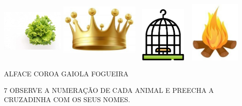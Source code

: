 \includegraphics[width=1.22307in,height=1.24422in]{media/image86.jpg}
\includegraphics[width=1.53669in,height=1.29710in]{media/image87.jpg}
\includegraphics[width=1.09375in,height=1.09375in]{media/image88.png}
\includegraphics[width=1.03854in,height=1.20356in]{media/image89.jpg}

\begin{mdframed}[linewidth=2pt,linecolor=salmao,roundcorner=2pt]
ALFACE \hfill COROA \hfill GAIOLA \hfill FOGUEIRA
\end{mdframed}

\pagebreak
\num{7} OBSERVE A NUMERAÇÃO DE CADA ANIMAL E PREECHA A CRUZADINHA COM OS SEUS NOMES.



